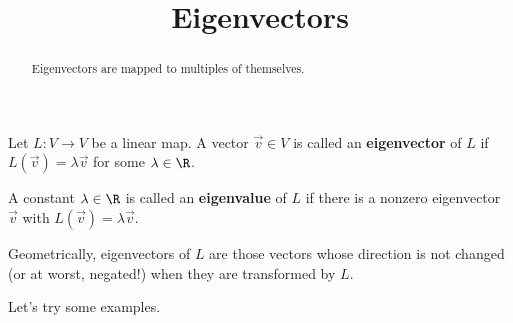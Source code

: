 \documentclass{ximera}
\title{Eigenvectors}
\begin{document}
\begin{abstract}
  Eigenvectors are mapped to multiples of themselves.
\end{abstract}\maketitle

\begin{definition}
  Let $L:V \to V$ be a linear map.  A vector $\vec{v} \in V$ is called
  an \textbf{eigenvector} of $L$ if $L(\vec{v}) = \lambda \vec{v}$ for
  some $\lambda \in \R$.

  A constant $\lambda \in \R$ is called an \textbf{eigenvalue} of $L$
  if there is a nonzero eigenvector $\vec{v}$ with $L(\vec{v}) =
  \lambda \vec{v}$.
\end{definition}

Geometrically, eigenvectors of $L$ are those vectors whose direction
is not changed (or at worst, negated!) when they are transformed by
$L$.

Let's try some examples.
\end{document}
